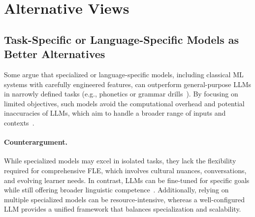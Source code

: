 

\section{Alternative Views}\label{sec:alternative_views}

\subsection{Task-Specific or Language-Specific Models as Better Alternatives}
Some argue that specialized or language-specific models, including classical ML systems with carefully engineered features, can outperform general-purpose LLMs in narrowly defined tasks (e.g., phonetics or grammar drills~\cite{fang2023chatgpt}). By focusing on limited objectives, such models avoid the computational overhead and potential inaccuracies of LLMs, which aim to handle a broader range of inputs and contexts~\cite{shen2024language}.

\paragraph{Counterargument.} While specialized models may excel in isolated tasks, they lack the flexibility required for comprehensive FLE, which involves cultural nuances, conversations, and evolving learner needs. In contrast, LLMs can be fine-tuned for specific goals while still offering broader linguistic competence~\cite{song2024multilingual}. Additionally, relying on multiple specialized models can be resource-intensive, whereas a well-configured LLM provides a unified framework that balances specialization and scalability.

